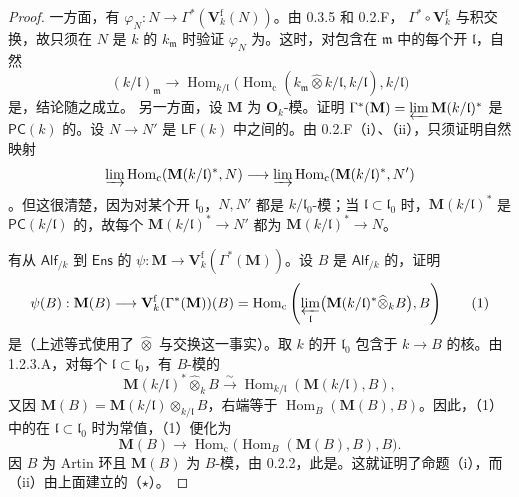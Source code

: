 \begin{proof}
一方面，有 $\varphi_N:N\to\Gamma^*(\mathbf V_k^{\mathrm f}(N))$。由 0.3.5 和 0.2.F， $\Gamma^*\circ\mathbf V_k^{\mathrm f}$ 与积交换，故只须在 $N$ 是 $k$ 的 $k_{\mathfrak m}$ 时验证 $\varphi_N$ 为。这时，对包含在 $\mathfrak m$ 中的每个开 $\mathfrak l$，自然
\[
 (k/\mathfrak l)_{\mathfrak m}\longrightarrow
 \operatorname{Hom}_{k/\mathfrak l}\bigl(\operatorname{Hom}_{\mathrm c}(k_{\mathfrak m}\widehat\otimes k/\mathfrak l,k/\mathfrak l),k/\mathfrak l\bigr)
\]
是，结论随之成立。
另一方面，设 $\mathbf M$ 为 $\mathbf O_k$-模。证明 $\Gamma^*(\mathbf M)=\varprojlim\mathbf M(k/\mathfrak l)^*$ 是 $\mathsf{PC}(k)$ 的。设 $N\to N'$ 是 $\mathsf{LF}(k)$ 中之间的。由 0.2.F（i）、（ii），只须证明自然映射
\[
 \varinjlim\operatorname{Hom}_{\mathrm c}(\mathbf M(k/\mathfrak l)^*,N)
 \longrightarrow\varinjlim\operatorname{Hom}_{\mathrm c}(\mathbf M(k/\mathfrak l)^*,N')
\]
。但这很清楚，因为对某个开 $\mathfrak l_0$，$N,N'$ 都是 $k/\mathfrak l_0$-模；当 $\mathfrak l\subset\mathfrak l_0$ 时，$\mathbf M(k/\mathfrak l)^*$ 是 $\mathsf{PC}(k/\mathfrak l)$ 的，故每个 $\mathbf M(k/\mathfrak l)^*\to N'$ 都为 $\mathbf M(k/\mathfrak l)^*\to N$。

有从 $\mathsf{Alf}_{/k}$ 到 $\mathsf{Ens}$ 的 $\psi:\mathbf M\to\mathbf V_k^{\mathrm f}(\Gamma^*(\mathbf M))$。设 $B$ 是 $\mathsf{Alf}_{/k}$ 的，证明
\[
 \psi(B):\mathbf M(B)\longrightarrow\mathbf V_k^{\mathrm f}(\Gamma^*(\mathbf M))(B)
 =\operatorname{Hom}_{\mathrm c}\left(\varprojlim_{\mathfrak l}\bigl(\mathbf M(k/\mathfrak l)^*\widehat\otimes_k B\bigr),B\right)\tag{1}
\]
是（上述等式使用了 $\widehat\otimes$ 与交换这一事实）。取 $k$ 的开 $\mathfrak l_0$ 包含于 $k\to B$ 的核。由 1.2.3.A，对每个 $\mathfrak l\subset\mathfrak l_0$，有 $B$-模的
\[
 \mathbf M(k/\mathfrak l)^*\widehat\otimes_k B\xrightarrow{\sim}\operatorname{Hom}_{k/\mathfrak l}(\mathbf M(k/\mathfrak l),B),
\]
又因 $\mathbf M(B)=\mathbf M(k/\mathfrak l)\otimes_{k/\mathfrak l}B$，右端等于 $\operatorname{Hom}_B(\mathbf M(B),B)$。因此，（1）中的在 $\mathfrak l\subset\mathfrak l_0$ 时为常值，（1）便化为
\[
 \mathbf M(B)\longrightarrow\operatorname{Hom}_{\mathrm c}\bigl(\operatorname{Hom}_B(\mathbf M(B),B),B\bigr).
\]
因 $B$ 为 Artin 环且 $\mathbf M(B)$ 为 $B$-模，由 0.2.2，此是。这就证明了命题（i），而（ii）由上面建立的（$\star$）。
\end{proof}
